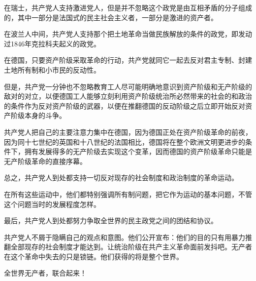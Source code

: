 \documentclass[UTF8]{ctexart}
\begin{document}
在瑞士，共产党人支持激进党人，但是并不忽略这个政党是由互相矛盾的分子组成的，其中一部分是法国式的民主社会主义者，一部分是激进的资产者。

在波兰人中间，共产党人支持那个把土地革命当做民族解放的条件的政党，即发动过1846年克拉科夫起义的政党。

在德国，只要资产阶级采取革命的行动，共产党就同它一起去反对君主专制、封建土地所有制和小市民的反动性。

但是，共产党一分钟也不忽略教育工人尽可能明确地意识到资产阶级和无产阶级的敌对的对立，以便德国工人能够立刻利用资产阶级统治所必然带来的社会的和政治的条件作为反对资产阶级的武器，以便在推翻德国的反动阶级之后立即开始反对资产阶级本身的斗争。

共产党人把自己的主要注意力集中在德国，因为德国正处在资产阶级革命的前夜，因为同十七世纪的英国和十八世纪的法国相比，德国将在整个欧洲文明更进步的条件下，拥有发展得多的无产阶级去实现这个变革，因而德国的资产阶级革命只能是无产阶级革命的直接序幕。

总之，共产党人到处都支持一切反对现存的社会制度和政治制度的革命运动。

在所有这些运动中，他们都特别强调所有制问题，把它作为运动的基本问题，不管这个问题当时的发展程度怎样。

最后，共产党人到处都努力争取全世界的民主政党之间的团结和协议。

共产党人不屑于隐瞒自己的观点和意图。他们公开宣布：他们的目的只有用暴力推翻全部现存的社会制度才能达到。让统治阶级在共产主义革命面前发抖吧。无产者在这个革命中失去的只是锁链。他们获得的将是整个世界。

全世界无产者，联合起来！
\end{document}
